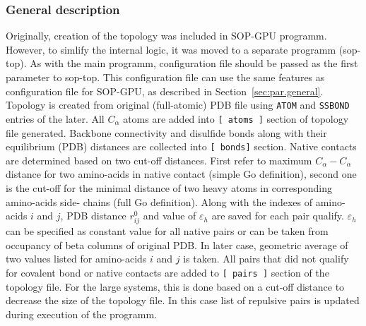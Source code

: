 \documentclass[a4paper]{article}
\begin{document}
\subsubsection{General description}
Originally, creation of the topology was included in SOP-GPU programm. However, to simlify the internal logic, it was moved to a separate programm (sop-top). As with the main programm, configuration file should be passed as the first parameter to sop-top. This configuration file can use the same features as configuration file for SOP-GPU, as described in Section~\ref{sec:par.general}. Topology is created from original (full-atomic) PDB file using \texttt{ATOM} and \texttt{SSBOND} entries of the later. All $C_{\alpha}$ atoms are added into \texttt{[ atoms ]} section of topology file generated. Backbone connectivity and disulfide bonds along with their equilibrium (PDB) distances are collected into \texttt{[ bonds]} section. Native contacts are determined based on two cut-off distances. First refer to maximum $C_{\alpha}-C_{\alpha}$ distance for two amino-acids in native contact (simple Go definition), second one is the cut-off for the minimal distance of two heavy atoms in corresponding amino-acids side-
chains (full Go definition). Along with the indexes of amino-acids $i$ and $j$, PDB distance $r^0_{ij}$ and value of $\varepsilon_h$ are saved for each pair qualify. $\varepsilon_h$ can be specified as constant value for all native pairs or can be taken from occupancy of beta columns of original PDB. In later case, geometric average of two values listed for amino-acids $i$ and $j$ is taken. All pairs that did not qualify for covalent bond or native contacts are added to \texttt{[ pairs ]} section of the topology file. For the large systems, this is done based on a cut-off distance to decrease the size of the topology file. In this case list of repulsive pairs is updated during execution of the programm.
\end{document}
